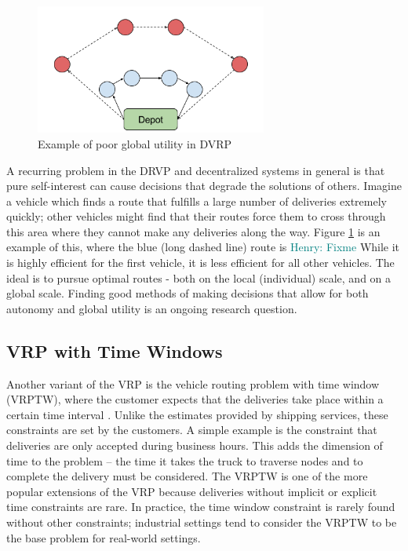 \documentclass{sig-alternate}
\newcommand{\allcomments}[1]{{#1}}
\newcommand{\hfcomment}[1]{\textcolor{Teal}{\allcomments{Henry: {#1}}}}
\begin{document}
\begin{figure}[t]
\centering
\includegraphics[width=3in, keepaspectratio]{utility.png}
\caption{Example of poor global utility in DVRP}
\label{fig:DVRPgraph}
\end{figure}
 A recurring problem in the DRVP and decentralized systems in general is that pure self-interest can cause decisions that degrade the solutions of others. Imagine a vehicle which finds a route that fulfills a large number of deliveries extremely quickly; other vehicles might find that their routes force them to cross through this area where they cannot make any deliveries along the way. Figure \ref{fig:DVRPgraph} is an example of this, where the blue (long dashed line) route is \hfcomment{Fixme} While it is highly efficient for the first vehicle, it is less efficient for all other vehicles. The ideal is to pursue optimal routes - both on the local (individual) scale, and on a global scale. Finding good methods of making decisions that allow for both autonomy and global utility is an ongoing research question. 
\subsection{VRP with Time Windows}
Another variant of the VRP is the vehicle routing problem with time window (VRPTW), where the customer expects that the deliveries take place within a certain time interval \cite{Caceres-Cruz:2014}. Unlike the estimates provided by shipping services, these constraints are set by the customers. A simple example is the constraint that deliveries are only accepted during business hours. This adds the dimension of time to the problem -- the time it takes the truck to traverse nodes and to complete the delivery must be considered. The VRPTW is one of the more popular extensions of the VRP because deliveries without implicit or explicit time constraints are rare. In practice, the time window constraint is rarely found without other constraints; industrial settings tend to consider the VRPTW to be the base problem for real-world settings. 
\end{document}
